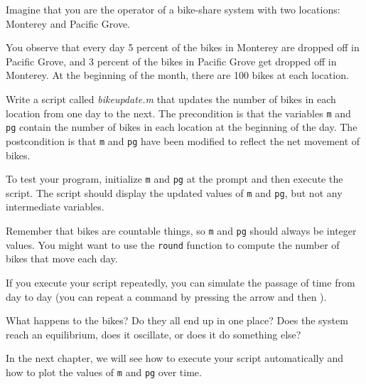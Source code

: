 \begin{ex}
\label{bikegame}

Imagine that you are the operator of a bike-share system with two
locations: Monterey and Pacific Grove.

You observe that every day 5 percent
of the bikes in Monterey are dropped off in Pacific Grove, and 3 percent of the bikes
in Pacific Grove get dropped off in Monterey.
At the beginning of the month, there are 100 bikes at each location.

Write a script called \emph{bike\textunderscore update.m} that updates the number
of bikes in each location from one day to the next.  The precondition
is that the variables \lstinline{m} and \lstinline{pg} contain the number of bikes
in each location at the beginning of the day.  The postcondition
is that \lstinline{m} and \lstinline{pg} have been modified to reflect the net movement of bikes.

To test your program, initialize \lstinline{m} and \lstinline{pg} at
the prompt and then execute the script.  The script should display
the updated values of \lstinline{m} and \lstinline{pg}, but not any intermediate
variables.

Remember that bikes are countable things, so \lstinline{m} and \lstinline{pg} should always be integer values.  You might want to use the \lstinline{round} function
to compute the number of bikes that move each day.

If you execute your script repeatedly, you can simulate the passage
of time from day to day (you can repeat a command by pressing the  arrow and then ).

What happens to the bikes?  Do they all end up in one place?  Does the system reach an equilibrium, does it oscillate, or does it do something else?

In the next chapter, we will see how to execute your script automatically
and how to plot the values of \lstinline{m} and \lstinline{pg} over time.

\end{ex}

